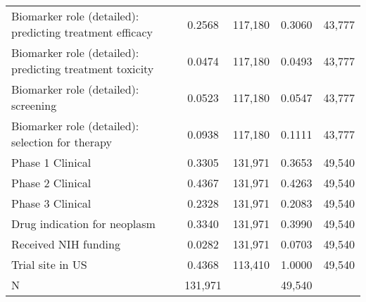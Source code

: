 \begin{table}[htbp]
\begin{tabular}{l*{2}{cc}}
Biomarker role (detailed): predicting treatment efficacy&      0.2568&     117,180&      0.3060&      43,777\\
Biomarker role (detailed): predicting treatment toxicity&      0.0474&     117,180&      0.0493&      43,777\\
Biomarker role (detailed): screening&      0.0523&     117,180&      0.0547&      43,777\\
Biomarker role (detailed): selection for therapy&      0.0938&     117,180&      0.1111&      43,777\\
Phase 1 Clinical    &      0.3305&     131,971&      0.3653&      49,540\\
Phase 2 Clinical    &      0.4367&     131,971&      0.4263&      49,540\\
Phase 3 Clinical    &      0.2328&     131,971&      0.2083&      49,540\\
Drug indication for neoplasm&      0.3340&     131,971&      0.3990&      49,540\\
Received NIH funding&      0.0282&     131,971&      0.0703&      49,540\\
Trial site in US    &      0.4368&     113,410&      1.0000&      49,540\\
\hline
N                   &     131,971&            &      49,540&            \\
\hline\hline
\end{tabular}
\end{table}
